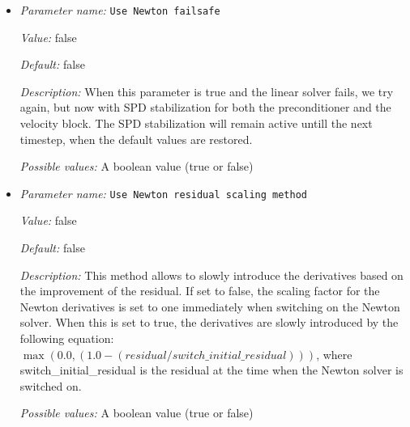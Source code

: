 \begin{itemize}
{\it Description:} If set to true, the Picard iteration uses the Eisenstat Walker method to determine how accurately linear systems need to be solved. The Picard iteration is used, for example, in the first few iterations of the Newton method before the matrix is built including derivatives of the model, since the Picard iteration generally converges even from points where Newton's method does not. 

Once derivatives are used in a Newton method, \aspect{} always uses the Eisenstat Walker method.


{\it Possible values:} A boolean value (true or false)
\item {\it Parameter name:} {\tt Use Newton failsafe}
\label{parameters:Solver parameters/Newton solver parameters/Use Newton failsafe}


{\it Value:} false


{\it Default:} false


{\it Description:} When this parameter is true and the linear solver fails, we try again, but now with SPD stabilization for both the preconditioner and the velocity block. The SPD stabilization will remain active untill the next timestep, when the default values are restored.


{\it Possible values:} A boolean value (true or false)
\item {\it Parameter name:} {\tt Use Newton residual scaling method}
\label{parameters:Solver parameters/Newton solver parameters/Use Newton residual scaling method}


{\it Value:} false


{\it Default:} false


{\it Description:} This method allows to slowly introduce the derivatives based on the improvement of the residual. If set to false, the scaling factor for the Newton derivatives is set to one immediately when switching on the Newton solver. When this is set to true, the derivatives are slowly introduced by the following equation: $\max(0.0, (1.0-(residual/switch\_initial\_residual)))$, where switch\_initial\_residual is the residual at the time when the Newton solver is switched on.


{\it Possible values:} A boolean value (true or false)
\end{itemize}

